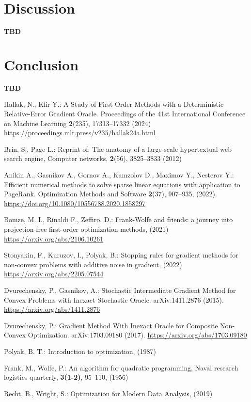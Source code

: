\documentclass[runningheads, final]{llncs}
\begin{document}
\section{Discussion}\label{sec:discussion}
\textbf{TBD}


\section{Conclusion}\label{sec:conclusion}
\textbf{TBD}

%
%
%
% 
% 
%
\begin{thebibliography}{8}
    Hallak, N., Kfir Y.: A Study of First-Order Methods with a Deterministic Relative-Error Gradient Oracle. Proceedings of the 41st International
    Conference on Machine Learning \textbf{2}(235), 17313--17332 (2024)
    \url{https://proceedings.mlr.press/v235/hallak24a.html}

    Brin, S., Page L.: Reprint of: The anatomy of a large-scale hypertextual
    web search engine, Computer networks, \textbf{2}(56), 3825--3833 (2012)

    Anikin A., Gasnikov A., Gornov A., Kamzolov D., Maximov Y., Nesterov Y.: Efficient numerical methods to solve sparse linear equations
    with application to PageRank. Optimization Methods and Software
    \textbf{2}(37), 907--935, (2022).
    \url{https://doi.org/10.1080/10556788.2020.1858297}

    Bomze, M. I., Rinaldi F., Zeffiro, D.: Frank-Wolfe and friends: a journey
    into projection-free first-order optimization methods, (2021)
    \url{https://arxiv.org/abs/2106.10261}

    Stonyakin, F., Kuruzov, I., Polyak, B.: Stopping rules for gradient methods
    for non-convex problems with additive noise in gradient, (2022)
    \url{https://arxiv.org/abs/2205.07544}

    Dvurechensky, P., Gasnikov, A.: Stochastic Intermediate Gradient Method for
    Convex Problems with Inexact Stochastic Oracle.
    arXiv:1411.2876 (2015). \url{https://arxiv.org/abs/1411.2876}

    Dvurechensky, P.: Gradient Method With Inexact Oracle for Composite
    Non-Convex Optimization.
    arXiv:1703.09180 (2017). \url{https://arxiv.org/abs/1703.09180}

    Polyak, B. T.: Introduction to optimization, (1987)

    Frank, M., Wolfe, P.: An algorithm for quadratic programming, Naval research
    logistics quarterly, \textbf{3(1-2)}, 95--110, (1956)

    Recht, B., Wright, S.: Optimization for Modern Data Analysis, (2019)
\end{thebibliography}
\end{document}
